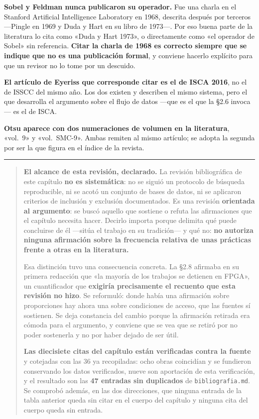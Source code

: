 \textbf{Sobel y Feldman nunca publicaron su operador.} Fue una charla en
el Stanford Artificial Intelligence Laboratory en 1968, descrita después
por terceros ---Pingle en 1969 y Duda y Hart en su libro de 1973---. Por
eso buena parte de la literatura lo cita como «Duda y Hart 1973», o
directamente como «el operador de Sobel» sin referencia. \textbf{Citar
la charla de 1968 es correcto siempre que se indique que no es una
publicación formal}, y conviene hacerlo explícito para que un revisor no
lo tome por un descuido.

\textbf{El artículo de Eyeriss que corresponde citar es el de ISCA
2016}, no el de ISSCC del mismo año. Los dos existen y describen el
mismo sistema, pero el que desarrolla el argumento sobre el flujo de
datos ---que es el que la §2.6 invoca--- es el de ISCA.

\textbf{Otsu aparece con dos numeraciones de volumen en la literatura},
«vol.~9» y «vol.~SMC-9». Ambas remiten al mismo artículo; se adopta la
segunda por ser la que figura en el índice de la revista.

\begin{center}\rule{0.5\linewidth}{0.5pt}\end{center}

\begin{quote}
\textbf{El alcance de esta revisión, declarado.} La revisión
bibliográfica de este capítulo \textbf{no es sistemática}: no se siguió
un protocolo de búsqueda reproducible, ni se acotó un conjunto de bases
de datos, ni se aplicaron criterios de inclusión y exclusión
documentados. Es una revisión \textbf{orientada al argumento}: se buscó
aquello que sostiene o refuta las afirmaciones que el capítulo necesita
hacer. Decirlo importa porque delimita qué puede concluirse de él
---sitúa el trabajo en su tradición--- y qué no: \textbf{no autoriza
ninguna afirmación sobre la frecuencia relativa de unas prácticas frente
a otras en la literatura.}

Esa distinción tuvo una consecuencia concreta. La §2.8 afirmaba en su
primera redacción que «la mayoría de los trabajos se detienen en FPGA»,
un cuantificador que \textbf{exigiría precisamente el recuento que esta
revisión no hizo}. Se reformuló: donde había una afirmación sobre
proporciones hay ahora una sobre condiciones de acceso, que las fuentes
sí sostienen. Se deja constancia del cambio porque la afirmación
retirada era cómoda para el argumento, y conviene que se vea que se
retiró por no poder sostenerla y no por haber dejado de ser útil.

\textbf{Las diecisiete citas del capítulo están verificadas contra la
fuente} y cotejadas con las 36 ya recopiladas: ocho obras coincidían y
se fundieron conservando los datos verificados, nueve son aportación de
esta verificación, y el resultado son las \textbf{47 entradas sin
duplicados} de \texttt{bibliografia.md}. Se comprobó además, en las dos
direcciones, que ninguna entrada de la tabla anterior queda sin citar en
el cuerpo del capítulo y ninguna cita del cuerpo queda sin entrada.
\end{quote}

